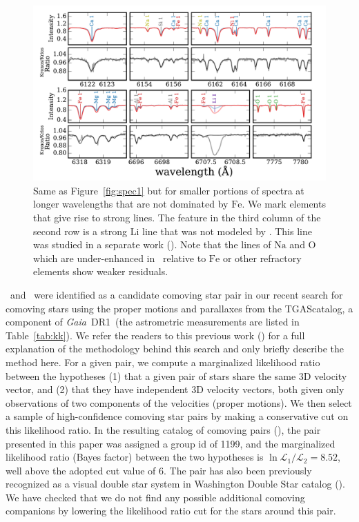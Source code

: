 \documentclass[modern, letterpaper]{aastex61}
\newcommand{\project}[1]{\textsl{#1}}
\newcommand{\acronym}[1]{{\small{#1}}}
\newcommand{\gaia}{\project{Gaia}}
\newcommand{\figname}{Figure}
\newcommand{\dr}{\acronym{DR1}}
\newcommand{\tgas}{\acronym{TGAS}}
\newcommand*\elem[1]{\ensuremath{\mathrm{#1}}}
\newcommand{\sunanalog}{\text{Krios}}
\newcommand{\bizarreone}{\text{Kronos}}
\renewcommand\tablename{Table}
\begin{document}
\begin{figure}[htpb]
  \centering
  \includegraphics[width=0.95\linewidth]{spec2.pdf}
  \caption{Same as \figname~\ref{fig:spec1}
    but for smaller portions of spectra at longer wavelengths that are
    not dominated by \elem{Fe}.
    We mark elements that give rise to strong lines.
    The feature in the third column of the second row is a strong \elem{Li}
    line that was not modeled by \citealt{2016ApJS..225...32B}. This line was
    studied in a separate work (\citealt{jmlithium}).
    Note that the lines of \elem{Na} and \elem{O} which are under-enhanced
    in \bizarreone\ relative to \elem{Fe} or other refractory elements
    show weaker residuals.
  }
  \label{fig:spec2}
\end{figure}

\sunanalog\ and \bizarreone\ were identified as a
candidate comoving star pair in our recent search for comoving stars using the
proper motions and parallaxes from the \tgas catalog, a component of \gaia\ \dr\
(the astrometric measurements are listed in \tablename~\ref{tab:kk}).
We refer the readers to this previous work (\citealt{2016arXiv161202440O}) for a
full explanation of the methodology behind this search and only briefly describe
the method here.
For a given pair, we compute a marginalized likelihood ratio between the
hypotheses (1) that a given pair of stars share the same 3D velocity vector, and
(2) that they have independent 3D velocity vectors, both given only observations
of two components of the velocities (proper motions).
We then select a sample of high-confidence comoving star pairs by making a
conservative cut on this likelihood ratio.
In the resulting catalog of comoving pairs (\citealt{2016arXiv161202440O}),
the pair presented in this paper was assigned a group id of 1199,
and the marginalized likelihood ratio (Bayes factor)
between the two hypotheses is $\ln{\mathcal{L}_1/\mathcal{L}_2} = 8.52$,
well above the adopted cut value of 6.
The pair has also been previously recognized as a visual double star system
in Washington Double Star catalog (\citealt{2001AJ....122.3466M}).
We have checked that we do not find any possible additional comoving companions
by lowering the likelihood ratio cut for the stars around this pair.
\end{document}
